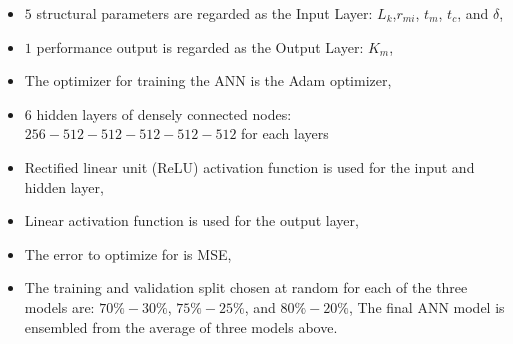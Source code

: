             
            \begin{itemize}
                \item $5$ structural parameters are regarded as the Input Layer: $L_k$,$r_{mi}$, $t_m$, $t_c$, and $\delta$,
                \item $1$ performance output is regarded as the Output Layer: $K_m$,
                \item The optimizer for training the \acs{ANN} is the Adam optimizer,
                \item $6$ hidden layers of densely connected nodes: $256-512-512-512-512-512$ for each layers
                \item Rectified linear unit (ReLU) activation function is used
for the input and hidden layer,
                \item Linear activation function is used for the output layer,
                \item The error to optimize for is \acf{MSE},
                \item The training and validation split chosen at random for each of the three models are: $70\%-30\%$, $75\%-25\%$, and $80\%-20\%$,
                The final \acs{ANN} model is ensembled from the average of three models above.
            \end{itemize}
            
